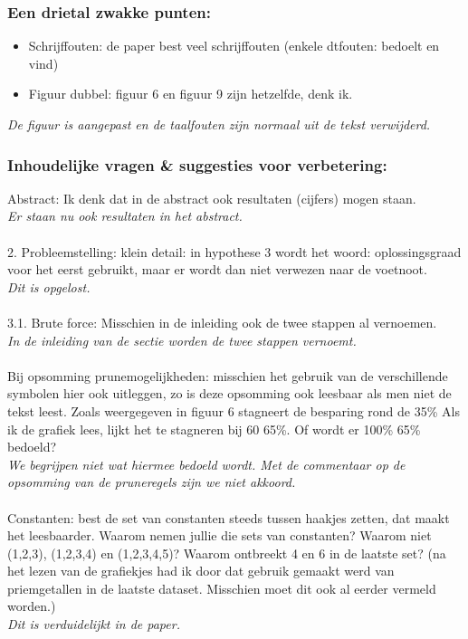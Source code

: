 \documentclass{article}
\begin{document}
\subsubsection{Een drietal zwakke punten:}
\begin{itemize}
\item Schrijffouten: de paper best veel schrijffouten (enkele dtfouten: bedoelt en vind)
\item Figuur dubbel: figuur 6 en figuur 9 zijn hetzelfde, denk ik.
\end{itemize}
\textit{De figuur is aangepast en de taalfouten zijn normaal uit de tekst verwijderd.}

\subsubsection{Inhoudelijke vragen \& suggesties voor verbetering:}
Abstract: Ik denk dat in de abstract ook resultaten (cijfers) mogen staan.\\
\textit{Er staan nu ook resultaten in het abstract.} \\ \\
2. Probleemstelling: klein detail: in hypothese 3 wordt het woord: oplossingsgraad voor het eerst gebruikt, maar er wordt dan niet verwezen naar de voetnoot. \\
\textit{Dit is opgelost.} \\ \\
3.1. Brute force: Misschien in de inleiding ook de twee stappen al vernoemen. \\
\textit{In de inleiding van de sectie worden de twee stappen vernoemt.} \\ \\
Bij opsomming prunemogelijkheden: misschien het gebruik van de verschillende symbolen hier ook uitleggen, zo is deze opsomming ook leesbaar als men niet de tekst leest. Zoals weergegeven in figuur 6 stagneert de besparing rond de 35\% Als ik de grafiek lees, lijkt het te stagneren bij 60 65\%. Of wordt er 100\% 65\% bedoeld? \\
\textit{We begrijpen niet wat hiermee bedoeld wordt. Met de commentaar op de opsomming van de pruneregels zijn we niet akkoord.} \\ \\ 

Constanten: best de set van constanten steeds tussen haakjes zetten, dat maakt het leesbaarder. Waarom nemen jullie die sets van constanten? Waarom niet (1,2,3), (1,2,3,4) en (1,2,3,4,5)? Waarom ontbreekt 4 en 6 in de laatste set? (na het lezen van de grafiekjes had ik door dat gebruik gemaakt werd van priemgetallen in de laatste dataset. Misschien moet dit ook al eerder vermeld worden.) \\
\textit{Dit is verduidelijkt in de paper.}
\end{document}
